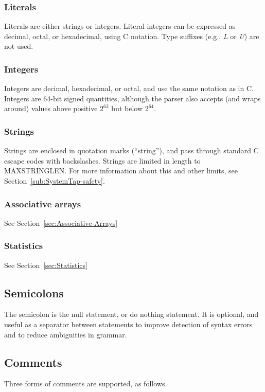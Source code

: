 \documentclass[twoside,english]{article}
\begin{document}
\subsubsection{Literals}
Literals are either strings or integers.
Literal integers can be expressed as decimal,
octal, or hexadecimal, using C notation. Type suffixes (e.g., \emph{L} or
\emph{U}) are not used.


\subsubsection{Integers\label{sub:Integers}}
 
Integers are decimal, hexadecimal, or octal, and use the same notation as
in C. Integers are 64-bit signed quantities, although the parser also accepts
(and wraps around) values above positive $2^{63}$ but below $2^{64}$.


\subsubsection{Strings\label{sub:Strings}}
Strings are enclosed in quotation marks ({}``string''), and pass through
standard C escape codes with backslashes. Strings are limited in length to
MAXSTRINGLEN. For more information about this and other limits, see
Section~\ref{sub:SystemTap-safety}.


\subsubsection{Associative arrays}

See Section~\ref{sec:Associative-Arrays}


\subsubsection{Statistics}

See Section~\ref{sec:Statistics}


\subsection{Semicolons}
\index{;}
The semicolon is the null statement, or do nothing statement. It is optional,
and useful as a separator between statements to improve detection of syntax
errors and to reduce ambiguities in grammar.


\subsection{Comments}
Three forms of comments are supported, as follows.
\end{document}
